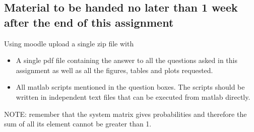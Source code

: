 \documentclass[12pt]{article} %
\begin{document}
\subsection{Material to be handed no later than 1 week after the end of this assignment}

Using moodle upload a single zip file with\\
\begin{minipage}{\linewidth}
\begin{framed}

\begin{itemize}
          \item A single pdf file containing the answer to all the questions asked in this assignment as well as all the figures, tables and plots requested.
          \item All matlab scripts mentioned in the  question boxes. The scripts should be written in independent text files that can be executed from matlab directly.
      \end{itemize}
\end{framed}
\end{minipage}

NOTE: remember that the system matrix gives probabilities and therefore the sum of all its element 
cannot be greater than 1.



\end{document}
